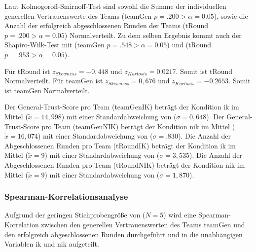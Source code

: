 \documentclass[a4paper,11pt]{article}%
\renewcommand{\\}{\vspace*{0.5\baselineskip} \newline}
\begin{document}
Laut Kolmogoroff-Smirnoff-Test sind sowohl die Summe der individuellen generellen Vertrauenswerte des Teams (\ac{teamGen} $p = .200 > \alpha = 0.05$), sowie die Anzahl der erfolgreich abgeschlossenen Runden der Teams (\ac{tRound} $p = .200 > \alpha = 0.05$) Normalverteilt.
Zu dem selben Ergebnis kommt auch der Shapiro-Wilk-Test mit (\ac{teamGen} $p = .548 > \alpha = 0.05$) und (\ac{tRound} $p = .953 > \alpha = 0.05$).

Für \ac{tRound} ist $ z_{Skewness} = -0,448 $ und $z_{Kurtosis} = 0.0217$. Somit ist tRound Normalverteilt.
Für \ac{teamGen} ist $ z_{Skewness} = 0,676 $ und $z_{Kurtosis} = -0.2653$. Somit ist teamGen Normalverteilt.

Der General-Trust-Score pro Team (\ac{teamGenIK}) beträgt der Kondition \ac{ik} im Mittel ($\tilde x = 14,998$) mit einer Standardabweichung von ($\sigma = 0,648$).\newline 
Der General-Trust-Score pro Team (\ac{teamGenNIK}) beträgt der Kondition \ac{nik} im Mittel ($\tilde x = 16,074$) mit einer Standardabweichung von ($\sigma = .830$). \newline 
Die Anzahl der Abgeschlossenen Runden pro Team (\ac{tRoundIK}) beträgt der Kondition \ac{ik} im Mittel ($\tilde x = 9$) mit einer Standardabweichung von ($\sigma = 3,535$).\newline 
 Die Anzahl der Abgeschlossenen Runden pro Team (\ac{tRoundNIK}) beträgt der Kondition \ac{nik} im Mittel ($\tilde x = 9$) mit einer Standardabweichung von ($\sigma = 1,870$). 



		\subsubsection{Spearman-Korrelationsanalyse}
Aufgrund der geringen Stichprobengröße von ($N=5$) wird eine Spearman-Korrelation zwischen den generellen Vertrauenswerten des Teams \ac{teamGen} und den erfolgreich abgeschlossenen Runden durchgeführt und in die unabhängigen Variablen \ac{ik} und \ac{nik} aufgeteilt.
%
\end{document}
